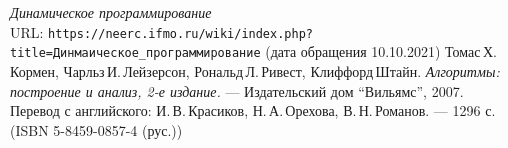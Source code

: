 \begin{thebibliography}{99}
{\itshape Динамическое программирование} \\ URL: \texttt{https://neerc.ifmo.ru/wiki/index.php?title=Динмаическое\_программирование} (дата обращения 10.10.2021)
Томас\,Х.\,Кормен, Чарльз\,И.\,Лейзерсон, Рональд\,Л.\,Ривест, Клиффорд\,Штайн.
{\itshape Алгоритмы: построение и анализ, 2-е издание.} --- Издательский дом \enquote{Вильямс}, 2007. Перевод с английского: И.\,В.\,Красиков, Н.\,А.\,Орехова, В.\,Н.\,Романов. --- 1296 с. (ISBN 5-8459-0857-4 (рус.))
 \end{thebibliography}
\pagebreak

